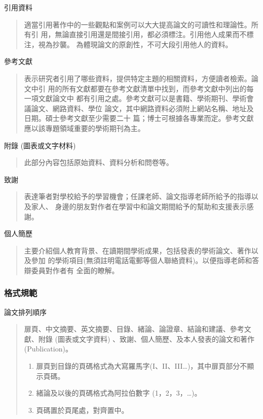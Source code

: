 \documentclass[
    writingLanguage=chinese, %
    addPageTitle=on,  %
    addDeclaration=on, %
    addMUSTlog=on, %
    addFigTOC=on, %
    addTabTOC=on, %
    refIndent=off, %
    printMod=off, %
]{must}
\begin{document}
\noindent\faHandORight 引用資料
\begin{quote}
適當引用著作中的一些觀點和案例可以大大提高論文的可讀性和理論性。所有引
用，無論直接引用還是間接引用，都必須標注。引用他人成果而不標注，視為抄襲。
為體現論文的原創性，不可大段引用他人的資料。

\end{quote}

\noindent\faHandORight 參考文獻
\begin{quote}
表示研究者引用了哪些資料，提供特定主題的相關資料，方便讀者檢索。論文中引
用的所有文獻都要在參考文獻清單中找到，而參考文獻中列出的每一項文獻論文中
都有引用之處。參考文獻可以是書籍、學術期刊、學術會議論文、網路資料、學位
論文，其中網路資料必須附上網站名稱、地址及日期。碩士參考文獻至少需要二十
篇；博士可根據各專業而定。參考文獻應以該專題領域重要的學術期刊為主。

\end{quote}



\noindent\faHandORight 附錄 (圖表或文字材料)
\begin{quote}
此部分內容包括原始資料、資料分析和問卷等。

\end{quote}



\noindent\faHandORight 致謝
\begin{quote}
表達筆者對學校給予的學習機會；任課老師、論文指導老師所給予的指導以及家人、
身邊的朋友對作者在學習中和論文期間給予的幫助和支援表示感謝。
\end{quote}



\noindent\faHandORight 個人簡歷
\begin{quote}
主要介紹個人教育背景、在讀期間學術成果，包括發表的學術論文、著作以及參加
的學術項目(無須註明電話電郵等個人聯絡資料)。以便指導老師和答辯委員對作者有
全面的瞭解。
\end{quote}



\subsubsection{格式規範}

\noindent\faHandORight 論文排列順序
\begin{quote}
扉頁、中文摘要、英文摘要、目錄、緒論、論證章、結論和建議、參考文獻、附錄
(圖表或文字資料) 、致謝、個人簡歷、及本人發表的論文和著作 (Publication)。

\begin{enumerate}
    \item 扉頁到目錄的頁碼格式為大寫羅馬字(I、II、III…)，其中扉頁部分不顯示頁碼。
    \item 緒論及以後的頁碼格式為阿拉伯數字 (1，2，3，…)。
    \item 頁碼置於頁尾處，對齊置中。
\end{enumerate}

\end{quote}
\end{document}
